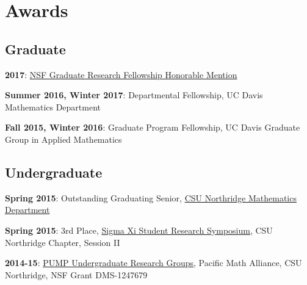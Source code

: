 \documentclass[letterpaper]{deedy-resume} %
\begin{document}
\begin{minipage}[t]{0.33\textwidth}
\section{Awards}
\subsection{Graduate}
\vspace{\topsep}
\begin{tightitemize}
    \item \textbf{2017}: \setmainfont[Path = fonts/lato/,BoldItalicFont=Lato-RegIta,BoldFont=Lato-Reg,ItalicFont=Lato-LigIta]{Lato-Lig}\href{https://www.fastlane.nsf.gov/grfp/AwardeeList.do?method=loadAwardeeList}{NSF Graduate Research Fellowship Honorable Mention}\setmainfont[Color=primary, Path = fonts/lato/]{Lato-Lig}
\end{tightitemize}\vspace{-3pt}
\begin{tightitemize}
    \item \textbf{Summer 2016, Winter 2017}: Departmental Fellowship, UC Davis Mathematics Department
    \item \textbf{Fall 2015, Winter 2016}: Graduate Program Fellowship, UC Davis Graduate Group in Applied Mathematics
\end{tightitemize}
\vspace{5pt}
\subsection{Undergraduate}
\vspace{\topsep}
\begin{tightitemize}
    \item \textbf{Spring 2015}: Outstanding Graduating Senior, \setmainfont[Path = fonts/lato/,BoldItalicFont=Lato-RegIta,BoldFont=Lato-Reg,ItalicFont=Lato-LigIta]{Lato-Lig}\href{http://www.csun.edu/science-mathematics/mathematics}{CSU Northridge Mathematics Department}\setmainfont[Color=primary, Path = fonts/lato/]{Lato-Lig}
\end{tightitemize}\vspace{-3pt}
\begin{tightitemize}
    \item \textbf{Spring 2015}: 3rd Place, \setmainfont[Path = fonts/lato/,BoldItalicFont=Lato-RegIta,BoldFont=Lato-Reg,ItalicFont=Lato-LigIta]{Lato-Lig}\href{https://www.csun.edu/~danielk/SigmaXi/}{Sigma Xi Student Research Symposium}\setmainfont[Color=primary, Path = fonts/lato/]{Lato-Lig}, CSU Northridge Chapter, Session II
\end{tightitemize}\vspace{-3pt}
\begin{tightitemize}
    \item \textbf{2014-15}: \setmainfont[Path = fonts/lato/,BoldItalicFont=Lato-RegIta,BoldFont=Lato-Reg,ItalicFont=Lato-LigIta]{Lato-Lig}\href{http://www.pump-math.org/home}{PUMP Undergraduate Research Groups}\setmainfont[Color=primary, Path = fonts/lato/]{Lato-Lig}, Pacific Math Alliance, CSU Northridge, NSF Grant DMS-1247679
\end{tightitemize}


\end{minipage}
\end{document}
